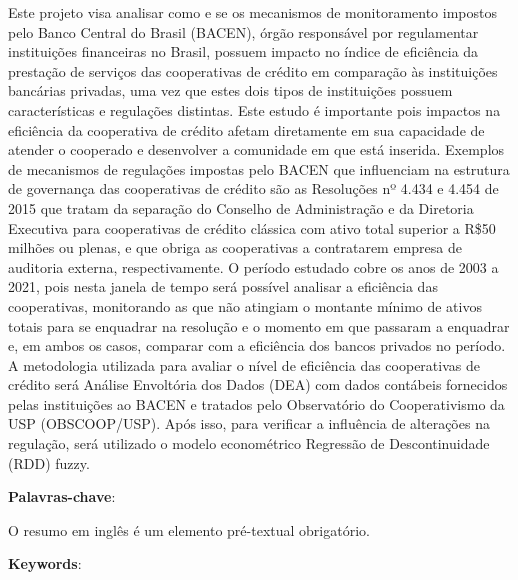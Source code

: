 \documentclass[ppgcc]{fearp}
\begin{document}
\begin{resumo}
\vspace{\onelineskip}

Este projeto visa analisar como e se os mecanismos de monitoramento impostos pelo Banco Central do Brasil (BACEN), órgão responsável por regulamentar instituições financeiras no Brasil, possuem impacto no índice de eficiência da prestação de serviços das cooperativas de crédito em comparação às instituições bancárias privadas, uma vez que estes dois tipos de instituições possuem características e regulações distintas. Este estudo é importante pois impactos na eficiência da cooperativa de crédito afetam diretamente em sua capacidade de atender o cooperado e desenvolver a comunidade em que está inserida. Exemplos de mecanismos de regulações impostas pelo BACEN que influenciam na estrutura de governança das cooperativas de crédito são as Resoluções nº 4.434  e 4.454 de 2015 que tratam da separação do Conselho de Administração e da Diretoria Executiva para cooperativas de crédito clássica com ativo total superior a R\$50 milhões ou plenas, e que obriga as cooperativas a contratarem empresa de auditoria externa, respectivamente. O período estudado cobre os anos de 2003 a 2021, pois nesta janela de tempo será possível analisar a eficiência das cooperativas, monitorando as que não atingiam o montante mínimo de ativos totais para se enquadrar na resolução e o momento em que passaram a enquadrar e, em ambos os casos, comparar com a eficiência dos bancos privados no período. A metodologia utilizada para avaliar o nível de eficiência das cooperativas de crédito será Análise Envoltória dos Dados (DEA) com dados contábeis fornecidos pelas instituições ao BACEN e tratados pelo Observatório do Cooperativismo da USP (OBSCOOP/USP). Após isso, para verificar a influência de alterações na regulação, será utilizado o modelo econométrico Regressão de Descontinuidade (RDD) fuzzy.

\vspace{\onelineskip}

\textbf{Palavras-chave}: \imprimirchaves

\end{resumo}

\begin{resumo}[Abstract]

O resumo em inglês é um elemento pré-textual obrigatório. 

\vspace*{\onelineskip}
\noindent
\textbf{Keywords}: \imprimirchaves \\
\jel{} 
\end{resumo}
\end{document}
